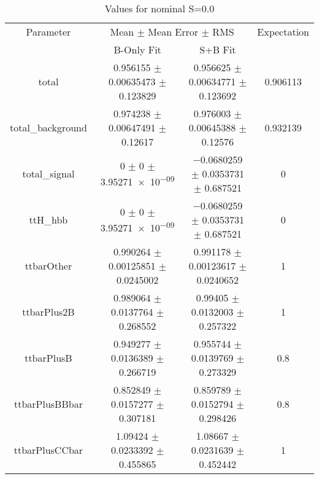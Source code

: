 \begin{table}
\centering
\caption{Values for nominal S=0.0}
\begin{tabular}{cccc}
\toprule
Parameter & \multicolumn{2}{c}{Mean $\pm$ Mean Error $\pm$ RMS} & Expectation\\
 & B-Only Fit & S+B Fit & \\
\midrule
total & \num{0.956155} $\pm$ \num{0.00635473} $\pm$ \num{0.123829} & \num{0.956625} $\pm$ \num{0.00634771} $\pm$ \num{0.123692} & \num{0.906113}\\
total\_background & \num{0.974238} $\pm$ \num{0.00647491} $\pm$ \num{0.12617} & \num{0.976003} $\pm$ \num{0.00645388} $\pm$ \num{0.12576} & \num{0.932139}\\
total\_signal & \num{0} $\pm$ \num{0} $\pm$ \num{3.95271e-09} & \num{-0.0680259} $\pm$ \num{0.0353731} $\pm$ \num{0.687521} & \num{0}\\
ttH\_hbb & \num{0} $\pm$ \num{0} $\pm$ \num{3.95271e-09} & \num{-0.0680259} $\pm$ \num{0.0353731} $\pm$ \num{0.687521} & \num{0}\\
ttbarOther & \num{0.990264} $\pm$ \num{0.00125851} $\pm$ \num{0.0245002} & \num{0.991178} $\pm$ \num{0.00123617} $\pm$ \num{0.0240652} & \num{1}\\
ttbarPlus2B & \num{0.989064} $\pm$ \num{0.0137764} $\pm$ \num{0.268552} & \num{0.99405} $\pm$ \num{0.0132003} $\pm$ \num{0.257322} & \num{1}\\
ttbarPlusB & \num{0.949277} $\pm$ \num{0.0136389} $\pm$ \num{0.266719} & \num{0.955744} $\pm$ \num{0.0139769} $\pm$ \num{0.273329} & \num{0.8}\\
ttbarPlusBBbar & \num{0.852849} $\pm$ \num{0.0157277} $\pm$ \num{0.307181} & \num{0.859789} $\pm$ \num{0.0152794} $\pm$ \num{0.298426} & \num{0.8}\\
ttbarPlusCCbar & \num{1.09424} $\pm$ \num{0.0233392} $\pm$ \num{0.455865} & \num{1.08667} $\pm$ \num{0.0231639} $\pm$ \num{0.452442} & \num{1}\\
\bottomrule
\end{tabular}
\end{table}